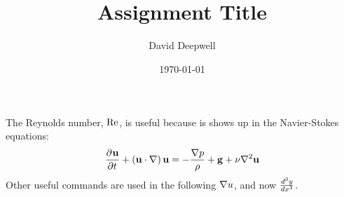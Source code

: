 \documentclass[11pt]{article}
\title{	
\horrule[0.5pt] \\[0.3cm] 
\huge Assignment Title
\horrule[2pt]
}
\author{David Deepwell}
\date{\today}
\begin{document}
\maketitle


The Reynolds number, $\Ren$, is useful because is shows up in the Navier-Stokes equations: 
\[ \pder{\vect{u}}{t} + \paren{\vect{u}\cdot\nabla} \vect{u}=-\frac{\vgrad{p}}{\rho}+\vect{g} + \nu \vlapl{\vect{u}}\]
Other useful commands are used in the following  $\vgrad{u}$, and now $\der[3]{y}{x}$.
\end{document}
